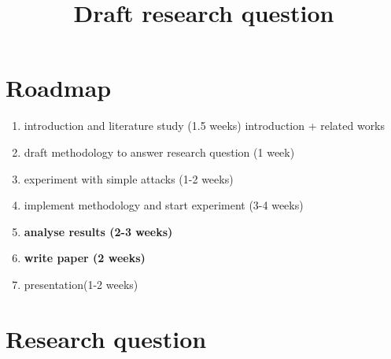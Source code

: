 \documentclass[11pt]{article}
\title{\textbf{Draft research question}}
\begin{document}
\maketitle

\section{Roadmap}

\begin{enumerate}
  \item introduction and literature study (1.5 weeks) introduction + related works
  \item draft methodology to answer research question (1 week)
  \item experiment with simple attacks (1-2 weeks)
  \item implement methodology and start experiment (3-4 weeks)
  \item \textbf{analyse results (2-3 weeks)}
  \item \textbf{write paper (2 weeks)}
  \item presentation(1-2 weeks)
\end{enumerate}

\section{Research question}
\end{document}
